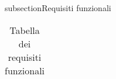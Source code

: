 subsection{Requisiti funzionali}

\begin{longtable}{ >{\centering}p{} >{\centering}p{}
		>{\raggedright}p{} >{\centering}p{}}
	\caption{Tabella dei requisiti funzionali}\\

	
	
	
\end{longtable}